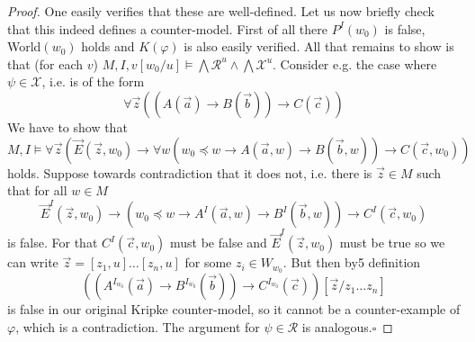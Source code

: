 \documentclass[runningheads]{llncs}
\begin{document}
\begin{proof}
	One easily verifies that these are well-defined. Let us now briefly check that this indeed defines a counter-model. First of all there ${P}^I(w_0)$ is false, World$(w_0)$ holds and $K(\varphi)$ is also easily verified. All that remains to show is that (for each $v$) $M, I, v[w_0/u]\models\bigwedge\mathcal R^{u}\wedge\bigwedge\mathcal X^{u}$. Consider e.g. the case where $\psi\in\mathcal X$, i.e. is of the form
	$$ \forall \vec z((A(\vec a)\to B(\vec b))\to C(\vec c))$$
	We have to show that
	$$M, I\models \forall \vec z(\vec E(\vec z, w_0)\to \forall w(w_0\preceq w\to A(\vec a, w)\to B(\vec b, w))\to C(\vec c, w_0))$$
	holds. Suppose towards contradiction that it does not, i.e. there is $\vec z\in M$ such that for all $w\in M$
	$$\vec E^I(\vec z, w_0)\to (w_0\preceq w\to {A}^I(\vec a, w)\to {B}^I(\vec b, w))\to {C}^I(\vec c, w_0)$$ is false. For that ${C}^I(\vec c, w_0)$ must be false and $\vec E^I(\vec z, w_0)$ must be true so we can write $\vec z = [z_1, u]\dots[z_n, u]$ for some $z_i\in W_{w_0}$. But then by5 definition
	$$((A^{I_{w_0}}(\vec a)\to B^{I_{w_0}}(\vec b))\to C^{I_{w_0}}(\vec c))[\vec z/z_1\dots z_n]$$ is false in our original Kripke counter-model, so it cannot be a counter-example of $\varphi$, which is a contradiction. The argument for $\psi\in\mathcal R$ is analogous.\hfill$\square$
\end{proof}
\end{document}
